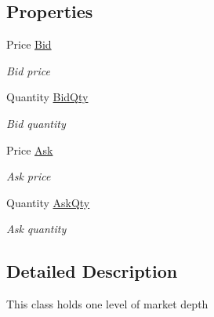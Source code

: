 \subsection*{Properties}
\begin{DoxyCompactItemize}
\item 
Price \hyperlink{class_e_z_a_p_i_1_1_containers_1_1_t_t_market_depth_level_a29181d4fbf948b4cd2f1f5860b60472d}{Bid}
\begin{DoxyCompactList}\small\item\em Bid price \end{DoxyCompactList}\item 
Quantity \hyperlink{class_e_z_a_p_i_1_1_containers_1_1_t_t_market_depth_level_a527925acf1a22cc66425ca52071d75a3}{Bid\-Qty}
\begin{DoxyCompactList}\small\item\em Bid quantity \end{DoxyCompactList}\item 
Price \hyperlink{class_e_z_a_p_i_1_1_containers_1_1_t_t_market_depth_level_a2d5b87a87e8e49927b5586d8d8789dac}{Ask}
\begin{DoxyCompactList}\small\item\em Ask price \end{DoxyCompactList}\item 
Quantity \hyperlink{class_e_z_a_p_i_1_1_containers_1_1_t_t_market_depth_level_a47030f9b968cbd8c327f754c33f5c3e7}{Ask\-Qty}
\begin{DoxyCompactList}\small\item\em Ask quantity \end{DoxyCompactList}\end{DoxyCompactItemize}


\subsection{Detailed Description}
This class holds one level of market depth 



